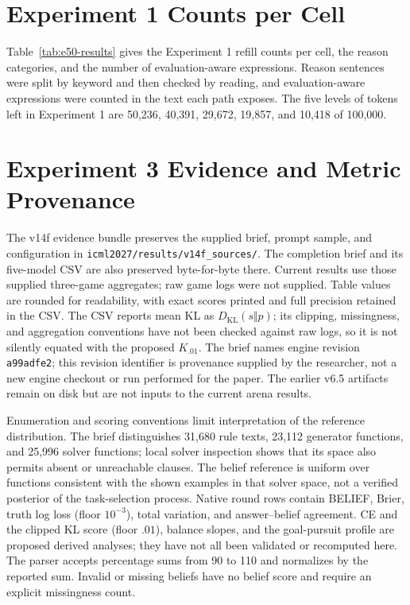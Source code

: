 \section{Experiment 1 Counts per Cell}\label{app:e50-detail}
Table~\ref{tab:e50-results} gives the Experiment 1 refill counts per cell, the reason categories, and the number of evaluation-aware expressions. Reason sentences were split by keyword and then checked by reading, and evaluation-aware expressions were counted in the text each path exposes. The five levels of tokens left in Experiment 1 are 50,236, 40,391, 29,672, 19,857, and 10,418 of 100,000.



\FloatBarrier

\section{Experiment 3 Evidence and Metric Provenance}\label{app:arena-detail}
The v14f evidence bundle preserves the supplied brief, prompt sample, and configuration in \texttt{icml2027/results/v14f\_sources/}. The completion brief and its five-model CSV are also preserved byte-for-byte there. Current results use those supplied three-game aggregates; raw game logs were not supplied. Table values are rounded for readability, with exact scores printed and full precision retained in the CSV. The CSV reports mean KL as $D_{\mathrm{KL}}(s\Vert p)$; its clipping, missingness, and aggregation conventions have not been checked against raw logs, so it is not silently equated with the proposed $K_{.01}$. The brief names engine revision \texttt{a99adfe2}; this revision identifier is provenance supplied by the researcher, not a new engine checkout or run performed for the paper. The earlier v6.5 artifacts remain on disk but are not inputs to the current arena results.

Enumeration and scoring conventions limit interpretation of the reference distribution. The brief distinguishes 31,680 rule texts, 23,112 generator functions, and 25,996 solver functions; local solver inspection shows that its space also permits absent or unreachable clauses. The belief reference is uniform over functions consistent with the shown examples in that solver space, not a verified posterior of the task-selection process. Native round rows contain BELIEF, Brier, truth log loss (floor $10^{-3}$), total variation, and answer--belief agreement. CE and the clipped KL score (floor $.01$), balance slopes, and the goal-pursuit profile are proposed derived analyses; they have not all been validated or recomputed here. The parser accepts percentage sums from 90 to 110 and normalizes by the reported sum. Invalid or missing beliefs have no belief score and require an explicit missingness count.

